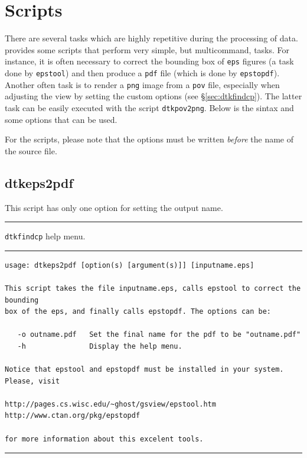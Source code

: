 \chapter{Scripts}

There are several tasks which are highly repetitive during the processing of data. \DTK{} provides some scripts that perform very simple, but multicommand, tasks. For instance, it is often necessary to correct the bounding box of \texttt{eps} figures (a task done by \texttt{epstool}) and then produce a \texttt{pdf} file (which is done by \texttt{epstopdf}). Another often task is to render a \texttt{png} image from a \texttt{pov} file, especially when adjusting the view by setting the custom options (see \S\ref{sec:dtkfindcp}). The latter task can be easily executed with the script \texttt{dtkpov2png}. Below is the sintax and some options that can be used.

For the scripts, please note that the options must be written \textit{before} the name of the source file.

\section{dtkeps2pdf}

This script has only one option for setting the output name.\\
\rule{\textwidth}{1pt}
{\center\texttt{dtkfindcp} help menu.\\}
\rule{\textwidth}{1pt}
\begin{footnotesize}
\begin{verbatim}
usage: dtkeps2pdf [option(s) [argument(s)]] [inputname.eps]

This script takes the file inputname.eps, calls epstool to correct the bounding
box of the eps, and finally calls epstopdf. The options can be:

   -o outname.pdf   Set the final name for the pdf to be "outname.pdf"
   -h               Display the help menu.

Notice that epstool and epstopdf must be installed in your system. Please, visit

http://pages.cs.wisc.edu/~ghost/gsview/epstool.htm
http://www.ctan.org/pkg/epstopdf

for more information about this excelent tools.
\end{verbatim}
\end{footnotesize}
\rule{\textwidth}{1pt}

